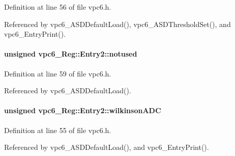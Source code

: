 Definition at line 56 of file vpc6.h.

Referenced by vpc6\_\-ASDDefaultLoad(), vpc6\_\-ASDThresholdSet(), and vpc6\_\-EntryPrint().
\paragraph[{notused}]{\setlength{\rightskip}{0pt plus 5cm}unsigned {\bf vpc6\_\-Reg::Entry2::notused}}\hfill\label{structvpc6__Reg_1_1Entry2_a0e5b6486dd1edbecf1c479d4f2bbc17a}


Definition at line 59 of file vpc6.h.

Referenced by vpc6\_\-ASDDefaultLoad().
\paragraph[{wilkinsonADC}]{\setlength{\rightskip}{0pt plus 5cm}unsigned {\bf vpc6\_\-Reg::Entry2::wilkinsonADC}}\hfill\label{structvpc6__Reg_1_1Entry2_a715eceda6c568044ceb1db35cfee48e6}


Definition at line 55 of file vpc6.h.

Referenced by vpc6\_\-ASDDefaultLoad(), and vpc6\_\-EntryPrint().